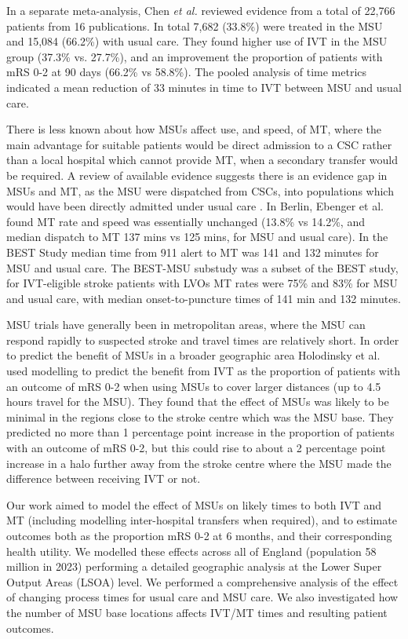 In a separate meta-analysis, Chen \textit{et al.} \cite{chen_systematic_2022} reviewed evidence from a total of 22,766 patients from 16 publications. In total 7,682 (33.8\%) were treated in the MSU and 15,084 (66.2\%) with usual care. They found higher use of IVT in the MSU group (37.3\% vs. 27.7\%), and an improvement the proportion of patients with mRS 0-2 at 90 days (66.2\% vs 58.8\%).  The pooled analysis of time metrics indicated a mean reduction of 33 minutes in time to IVT between MSU and usual care.

There is less known about how MSUs affect use, and speed, of MT, where the main advantage for suitable patients would be direct admission to a CSC rather than a local hospital which cannot provide MT, when a secondary transfer would be required. A review of available evidence suggests there is an evidence gap in MSUs and MT, as the MSU were dispatched from CSCs, into populations which would have been directly admitted under usual care \cite{navi_mobile_2022}. In Berlin, Ebenger et al. \cite{ebinger_association_2021} found MT rate and speed was essentially unchanged (13.8\% vs 14.2\%, and median dispatch to MT 137 mins vs 125 mins, for MSU and usual care). In the BEST Study \cite{grotta_prospective_2021} median time from 911 alert to MT was 141 and 132 minutes for MSU and usual care. The BEST-MSU substudy \cite{czap_abstract_2022} was a subset of the BEST study, for IVT-eligible stroke patients with LVOs MT rates were 75\% and 83\% for MSU and usual care,  with median onset-to-puncture times of 141 min and 132 minutes.


MSU trials have generally been in metropolitan areas, where the MSU can respond rapidly to suspected stroke and travel times are relatively short. In order to predict the benefit of MSUs in a broader geographic area Holodinsky et al. \cite{holodinsky_jessalyn_k_what_2020} used modelling to predict the benefit from IVT as the proportion of patients with an outcome of mRS 0-2 when using MSUs to cover larger distances (up to 4.5 hours travel for the MSU). They found that the effect of MSUs was likely to be  minimal in the regions close to the stroke centre which was the MSU base. They predicted no more than 1 percentage point increase in the proportion of patients with an outcome of mRS 0-2, but this could rise to about a 2 percentage point increase in a halo further away from the stroke centre where the MSU made the difference between receiving IVT or not.


Our work aimed to model the effect of MSUs on likely times to both IVT and MT (including modelling inter-hospital transfers when required), and to estimate outcomes both as the proportion mRS 0-2 at 6 months, and their corresponding health utility. We modelled these effects across  all of England (population 58 million in 2023) performing a detailed geographic analysis at the Lower Super Output Areas (LSOA) level. We performed a comprehensive analysis of the effect of changing process times for usual care and MSU care. We also investigated how the number of MSU base locations affects IVT/MT times and resulting patient outcomes.